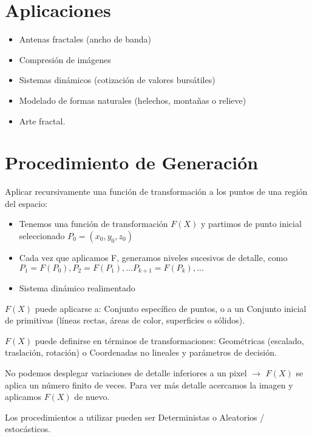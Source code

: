 \section{Aplicaciones}
\begin{itemize}
    \item Antenas fractales (ancho de banda)
    \item Compresión de imágenes
    \item Sistemas dinámicos (cotización de valores bursátiles)
    \item Modelado de formas naturales (helechos, montañas o relieve)
    \item Arte fractal.
\end{itemize}

\section{Procedimiento de Generación}
Aplicar recursivamente una función de transformación a los puntos de una región del espacio:
\begin{itemize}
    \item Tenemos una función de transformación $F(X)$ y partimos de punto inicial seleccionado $P_0 =(x_0 , y_0 , z_0 )$
    \item Cada vez que aplicamos F, generamos niveles sucesivos de detalle, como $P_1 =F(P_0 ), P_2 =F(P_1 ), ... P_{k+1} =F(P_k ), ...$
    \item Sistema dinámico realimentado
\end{itemize} 

$F(X)$ puede aplicarse a: Conjunto específico de puntos, o a un Conjunto inicial de primitivas (líneas rectas, áreas de color, superficies o sólidos). 

$F(X)$ puede definirse en términos de transformaciones: Geométricas (escalado, traslación, rotación) o Coordenadas no lineales y parámetros de decisión.

No podemos desplegar variaciones de detalle inferiores a un pixel $\rightarrow$ $F(X)$ se aplica un número finito de veces. Para ver más detalle acercamos la imagen y aplicamos $F(X)$ de nuevo.

Los procedimientos a utilizar pueden ser Deterministas o Aleatorios / estocásticos.


